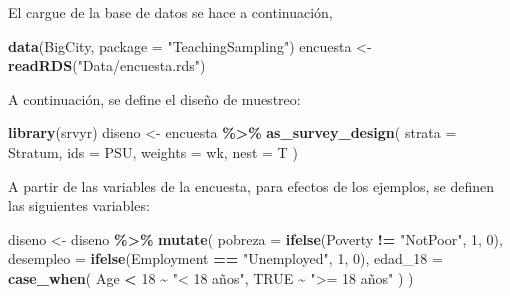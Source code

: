 \documentclass[
  12pt,
]{book}
\newenvironment{Shaded}{\begin{snugshade}}{\end{snugshade}}
\newcommand{\AttributeTok}[1]{\textcolor[rgb]{0.13,0.29,0.53}{#1}}
\newcommand{\ConstantTok}[1]{\textcolor[rgb]{0.56,0.35,0.01}{#1}}
\newcommand{\DecValTok}[1]{\textcolor[rgb]{0.00,0.00,0.81}{#1}}
\newcommand{\FunctionTok}[1]{\textcolor[rgb]{0.13,0.29,0.53}{\textbf{#1}}}
\newcommand{\NormalTok}[1]{#1}
\newcommand{\OtherTok}[1]{\textcolor[rgb]{0.56,0.35,0.01}{#1}}
\newcommand{\SpecialCharTok}[1]{\textcolor[rgb]{0.81,0.36,0.00}{\textbf{#1}}}
\newcommand{\StringTok}[1]{\textcolor[rgb]{0.31,0.60,0.02}{#1}}
\begin{document}
El cargue de la base de datos se hace a continuación,

\begin{Shaded}
\begin{Highlighting}[]
\FunctionTok{data}\NormalTok{(BigCity, }\AttributeTok{package =} \StringTok{"TeachingSampling"}\NormalTok{)}
\NormalTok{encuesta }\OtherTok{\textless{}{-}} \FunctionTok{readRDS}\NormalTok{(}\StringTok{"Data/encuesta.rds"}\NormalTok{)}
\end{Highlighting}
\end{Shaded}

A continuación, se define el diseño de muestreo:

\begin{Shaded}
\begin{Highlighting}[]
\FunctionTok{library}\NormalTok{(srvyr)}
\NormalTok{diseno }\OtherTok{\textless{}{-}}\NormalTok{ encuesta }\SpecialCharTok{\%\textgreater{}\%}
  \FunctionTok{as\_survey\_design}\NormalTok{(}
    \AttributeTok{strata =}\NormalTok{ Stratum,}
    \AttributeTok{ids =}\NormalTok{ PSU,}
    \AttributeTok{weights =}\NormalTok{ wk,}
    \AttributeTok{nest =}\NormalTok{ T}
\NormalTok{  )}
\end{Highlighting}
\end{Shaded}

A partir de las variables de la encuesta, para efectos de los ejemplos, se definen las siguientes variables:

\begin{Shaded}
\begin{Highlighting}[]
\NormalTok{diseno }\OtherTok{\textless{}{-}}\NormalTok{ diseno }\SpecialCharTok{\%\textgreater{}\%} \FunctionTok{mutate}\NormalTok{(}
  \AttributeTok{pobreza =} \FunctionTok{ifelse}\NormalTok{(Poverty }\SpecialCharTok{!=} \StringTok{"NotPoor"}\NormalTok{, }\DecValTok{1}\NormalTok{, }\DecValTok{0}\NormalTok{),}
  \AttributeTok{desempleo =} \FunctionTok{ifelse}\NormalTok{(Employment }\SpecialCharTok{==} \StringTok{"Unemployed"}\NormalTok{, }\DecValTok{1}\NormalTok{, }\DecValTok{0}\NormalTok{),}
  \AttributeTok{edad\_18 =} \FunctionTok{case\_when}\NormalTok{(}
\NormalTok{    Age }\SpecialCharTok{\textless{}} \DecValTok{18} \SpecialCharTok{\textasciitilde{}} \StringTok{"\textless{} 18 años"}\NormalTok{,}
    \ConstantTok{TRUE} \SpecialCharTok{\textasciitilde{}} \StringTok{"\textgreater{}= 18 años"}
\NormalTok{  )}
\NormalTok{)}
\end{Highlighting}
\end{Shaded}
\end{document}
